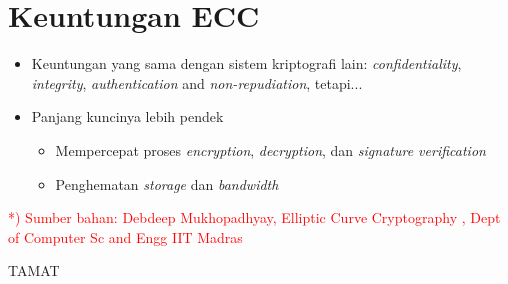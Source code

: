 \documentclass{article}
\begin{document}
\section*{Keuntungan ECC}

\begin{itemize}
    \item Keuntungan yang sama dengan sistem kriptografi lain: \textit{confidentiality}, \textit{integrity}, \textit{authentication} and \textit{non-repudiation}, tetapi...
    \item Panjang kuncinya lebih pendek
    \begin{itemize}
        \item Mempercepat proses \textit{encryption}, \textit{decryption}, dan \textit{signature verification}
        \item Penghematan \textit{storage} dan \textit{bandwidth}
    \end{itemize}
\end{itemize}

\vspace{50mm}

\textcolor{red}{*) Sumber bahan: Debdeep Mukhopadhyay, Elliptic Curve Cryptography , Dept of Computer Sc and Engg IIT Madras}

\newpage


TAMAT
\end{document}
